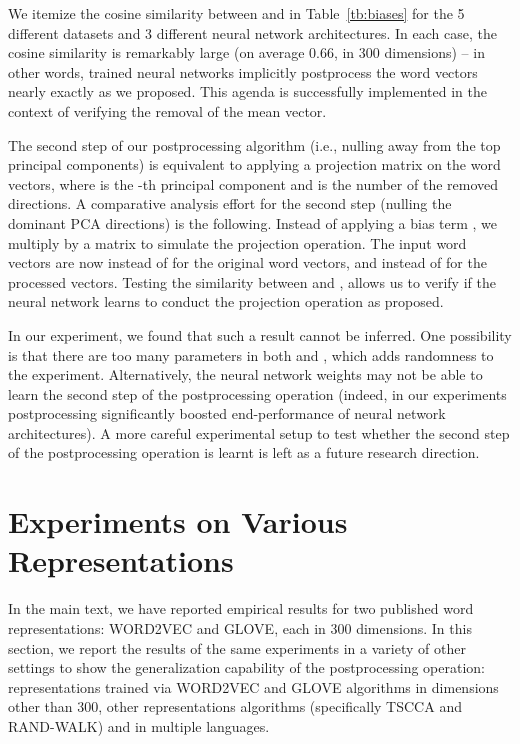 \documentclass{article} \usepackage{acl2017,times}
\begin{document}
{We itemize the cosine similarity between   and   in Table~\ref{tb:biases} for the 5 different datasets and 3 different neural network architectures. In each case,  the cosine similarity is remarkably large (on average 0.66, in 300 dimensions) -- in other words, trained neural networks   implicitly postprocess the word vectors nearly exactly as we proposed.
This  agenda is successfully implemented  in the  context of verifying the  removal of the mean vector.  

The second step of our postprocessing algorithm (i.e., nulling away from the top principal components) is equivalent to applying a projection matrix  on  the word vectors, where  is the -th principal component and  is the number of the removed directions. 
 A comparative analysis effort for the second step  (nulling the dominant PCA directions) is the following. Instead of applying a bias term , we multiply by a matrix  to simulate the projection operation. The input word vectors are now  instead of  for the original word vectors, and  instead of  for the processed vectors. Testing the similarity between  and , allows us to verify if the neural network learns to conduct the projection operation as proposed. 
 
 In our experiment, we found that such a  result cannot be inferred. One possibility is that there are too many parameters in both  and , which adds  randomness to the experiment. Alternatively, the neural network weights may not be able to learn the second step of the postprocessing operation (indeed, in our experiments postprocessing significantly boosted end-performance of neural network architectures).  A more careful experimental setup  to test whether the second step of the postprocessing operation  is learnt is left  as a future research direction. 
 }
 
 \section{Experiments on Various Representations}
\label{app:extra}
In the main text, we have reported empirical results for two published word representations:    WORD2VEC and GLOVE, each in 300 dimensions. In this section, we report the results of the same  experiments in a variety of other settings to show the generalization capability of the postprocessing operation: representations trained via WORD2VEC and GLOVE algorithms in  dimensions other than 300, other representations algorithms (specifically TSCCA and RAND-WALK) and in  multiple languages.
\end{document}
